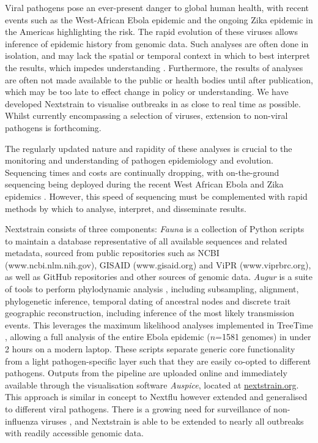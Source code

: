 \documentclass{bioinfo}
\begin{document}
\maketitle

Viral pathogens pose an ever-present danger to global human health, with recent events such as the West-African Ebola epidemic and the ongoing Zika epidemic in the Americas highlighting the risk.
The rapid evolution of these viruses allows inference of epidemic history from genomic data.
Such analyses are often done in isolation, and may lack the spatial or temporal context in which to best interpret the results, which impedes understanding \citep{pybus2013evolutionary}.
Furthermore, the results of analyses are often not made available to the public or health bodies until after publication, which may be too late to effect change in policy or understanding.
We have developed Nextstrain to visualise outbreaks in as close to real time as possible.
Whilst currently encompassing a selection of viruses, extension to non-viral pathogens is forthcoming.

The regularly updated nature and rapidity of these analyses is crucial to the monitoring and understanding of pathogen epidemiology and evolution.
Sequencing times and costs are continually dropping, with on-the-ground sequencing being deployed during the recent West African Ebola and Zika epidemics \citep{quick2016real,faria2017epidemic}.
However, this speed of sequencing must be complemented with rapid methods by which to analyse, interpret, and disseminate results.

Nextstrain consists of three components:
\textit{Fauna} is a collection of Python scripts to maintain a database representative of all available sequences and related metadata, sourced from public repositories such as NCBI (www.ncbi.nlm.nih.gov), GISAID (www.gisaid.org) and ViPR (www.viprbrc.org), as well as GitHub repositories and other sources of genomic data.
\textit{Augur} is a suite of tools to perform phylodynamic analysis \citep{voltz2013}, including subsampling, alignment, phylogenetic inference, temporal dating of ancestral nodes and discrete trait geographic reconstruction, including inference of the most likely transmission events.
This leverages the maximum likelihood analyses implemented in TreeTime \citep{sagulenko2017treetime}, allowing a full analysis of the entire Ebola epidemic ($n$=1581 genomes) in under 2 hours on a modern laptop.
These scripts separate generic core functionality from a light pathogen-specific layer such that they are easily co-opted to different pathogens.
Outputs from the pipeline are uploaded online and immediately available through the visualisation software \textit{Auspice}, located at \href{http://nextstrain.org}{nextstrain.org}.
This approach is similar in concept to Nextflu \citep{neher2015nextflu} however extended and generalised to different viral pathogens.
There is a growing need for surveillance of non-influenza viruses \citep{tang2017global}, and Nextstrain is able to be extended to nearly all outbreaks with readily accessible genomic data.
\end{document}
